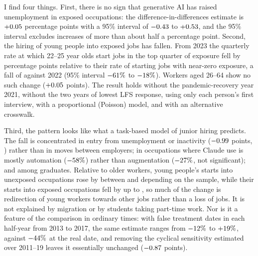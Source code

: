 \documentclass[11pt]{article}
\begin{document}
I find four things. First, there is no sign that generative AI has raised unemployment in exposed occupations: the difference-in-differences estimate is $+0.05$ percentage points with a 95\% interval of $-0.43$ to $+0.53$, and the 95\% interval excludes increases of more than about half a percentage point. Second, the hiring of young people into exposed jobs has fallen. From 2023 the quarterly rate at which 22--25 year olds start jobs in the top quarter of exposure fell by \entryEstAbs{} percentage points relative to their rate of starting jobs with near-zero exposure, a fall of \entryPctAbs{} against 2022 (95\% interval $-61\%$ to $-18\%$). Workers aged 26--64 show no such change ($+0.05$ points). The result holds without the pandemic-recovery year 2021, without the two years of lowest LFS response, using only each person's first interview, with a proportional (Poisson) model, and with an alternative crosswalk.

Third, the pattern looks like what a task-based model of junior hiring predicts. The fall is concentrated in entry from unemployment or inactivity ($-0.99$ points, \chanYoungEntryP) rather than in moves between employers; in occupations where Claude use is mostly automation ($-58\%$) rather than augmentation ($-27\%$, not significant); and among graduates. Relative to older workers, young people's starts into unexposed occupations rose by between \redirZeroAbs{} and \redirZeroUKAbs{} depending on the sample, while their starts into exposed occupations fell by up to \redirHighAbs, so much of the change is redirection of young workers towards other jobs rather than a loss of jobs. It is not explained by migration or by students taking part-time work. Nor is it a feature of the comparison in ordinary times: with false treatment dates in each half-year from 2013 to 2017, the same estimate ranges from $-12\%$ to $+19\%$, against $-44\%$ at the real date, and removing the cyclical sensitivity estimated over 2011--19 leaves it essentially unchanged ($-0.87$ points).
\end{document}
